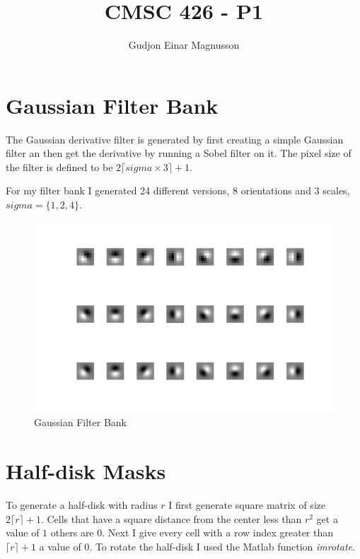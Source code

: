 \documentclass[12pt]{article}
\begin{document}
\title{CMSC 426 - P1}
\author{Gudjon Einar Magnusson}

\maketitle

\section{Gaussian Filter Bank}

The Gaussian derivative filter is generated by first creating a simple Gaussian filter an then get the derivative by running a Sobel filter on it. The pixel size of the filter is defined to be $2\lceil sigma \times 3 \rceil + 1$.

For my filter bank I generated 24 different versions, 8 orientations and 3 scales, $sigma = \{1, 2, 4\}$.

\begin{figure}
    \includegraphics[width=\linewidth]{img/gfbank}
    \caption{Gaussian Filter Bank}
    \label{fig_gfbank}
\end{figure}


\section{Half-disk Masks}

To generate a half-disk with radius $r$ I first generate square matrix of size $2\lceil r \rceil +1$. Cells that have a square distance from the center less than $r^2$ get a value of $1$ others are $0$. Next I give every cell with a row index greater than $\lceil r \rceil +1$ a value of $0$. To rotate the half-disk I used the Matlab function \textit{imrotate}.
\end{document}
